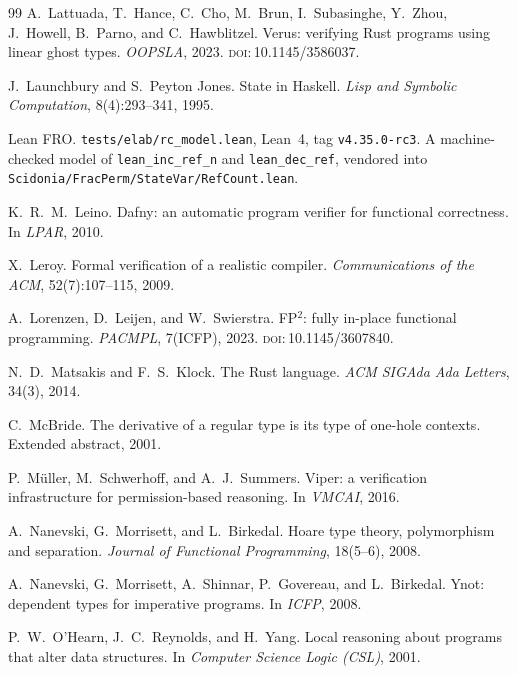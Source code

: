 \documentclass[11pt,a4paper]{article}
\theoremstyle{definition}
\theoremstyle{plain}
\newcommand{\code}[1]{\texttt{#1}}
\newcommand{\doi}[1]{\textsc{doi}:\,#1}
\begin{document}
\begin{thebibliography}{99}
A.~Lattuada, T.~Hance, C.~Cho, M.~Brun, I.~Subasinghe, Y.~Zhou, J.~Howell,
B.~Parno, and C.~Hawblitzel.
\newblock Verus: verifying Rust programs using linear ghost types.
\newblock \emph{OOPSLA}, 2023.
\newblock \doi{10.1145/3586037}.

J.~Launchbury and S.~Peyton Jones.
\newblock State in Haskell.
\newblock \emph{Lisp and Symbolic Computation}, 8(4):293--341, 1995.

Lean FRO.
\newblock \code{tests/elab/rc\_model.lean}, Lean~4, tag \code{v4.35.0-rc3}.
\newblock A machine-checked model of \code{lean\_inc\_ref\_n} and
\code{lean\_dec\_ref}, vendored into \code{Scidonia/FracPerm/StateVar/RefCount.lean}.

K.~R.~M.~Leino.
\newblock Dafny: an automatic program verifier for functional correctness.
\newblock In \emph{LPAR}, 2010.

X.~Leroy.
\newblock Formal verification of a realistic compiler.
\newblock \emph{Communications of the ACM}, 52(7):107--115, 2009.

A.~Lorenzen, D.~Leijen, and W.~Swierstra.
\newblock FP${}^2$: fully in-place functional programming.
\newblock \emph{PACMPL}, 7(ICFP), 2023.
\newblock \doi{10.1145/3607840}.

N.~D.~Matsakis and F.~S.~Klock.
\newblock The Rust language.
\newblock \emph{ACM SIGAda Ada Letters}, 34(3), 2014.

C.~McBride.
\newblock The derivative of a regular type is its type of one-hole contexts.
\newblock Extended abstract, 2001.

P.~M\"uller, M.~Schwerhoff, and A.~J.~Summers.
\newblock Viper: a verification infrastructure for permission-based reasoning.
\newblock In \emph{VMCAI}, 2016.

A.~Nanevski, G.~Morrisett, and L.~Birkedal.
\newblock Hoare type theory, polymorphism and separation.
\newblock \emph{Journal of Functional Programming}, 18(5--6), 2008.

A.~Nanevski, G.~Morrisett, A.~Shinnar, P.~Govereau, and L.~Birkedal.
\newblock Ynot: dependent types for imperative programs.
\newblock In \emph{ICFP}, 2008.

P.~W.~O'Hearn, J.~C.~Reynolds, and H.~Yang.
\newblock Local reasoning about programs that alter data structures.
\newblock In \emph{Computer Science Logic (CSL)}, 2001.


\end{thebibliography}
\end{document}
